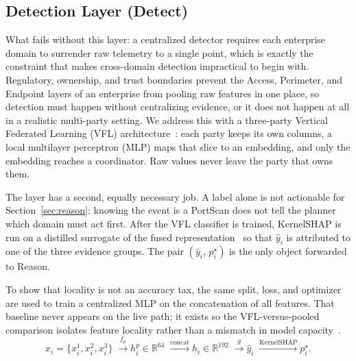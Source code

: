 
\subsection{Detection Layer (Detect)}
\label{sec:detect}

What fails without this layer: a centralized detector requires each enterprise domain to surrender raw telemetry to a single point, which is exactly the constraint that makes cross-domain detection impractical to begin with. Regulatory, ownership, and trust boundaries prevent the Access, Perimeter, and Endpoint layers of an enterprise from pooling raw features in one place, so detection must happen without centralizing evidence, or it does not happen at all in a realistic multi-party setting. We address this with a three-party Vertical Federated Learning (VFL) architecture~\cite{liu2024vfl,folino2024,alazab2022}: each party keeps its own columns, a local multilayer perceptron (MLP) maps that slice to an embedding, and only the embedding reaches a coordinator. Raw values never leave the party that owns them.

The layer has a second, equally necessary job. A label alone is not actionable for Section~\ref{sec:reason}: knowing the event is a PortScan does not tell the planner which domain must act first. After the VFL classifier is trained, KernelSHAP is run on a distilled surrogate of the fused representation~\cite{wu2023falcon} so that $\hat{y}_i$ is attributed to one of the three evidence groups. The pair $(\hat{y}_i,\, p_i^{\star})$ is the only object forwarded to Reason.

To show that locality is not an accuracy tax, the same split, loss, and optimizer are used to train a centralized MLP on the concatenation of all features. That baseline never appears on the live path; it exists so the VFL-versus-pooled comparison isolates feature locality rather than a mismatch in model capacity~\cite{ye2024vfl}.
\begin{equation}
x_i=\{x_i^1,x_i^2,x_i^3\}
\;\xrightarrow{f_p}
h_i^p\in\mathbb{R}^{64}
\;\xrightarrow{\mathrm{concat}}
h_i\in\mathbb{R}^{192}
\;\xrightarrow{g}
\hat{y}_i
\;\xrightarrow{\mathrm{KernelSHAP}}
p_i^{\star}.
\label{eq:detect-pipeline}
\end{equation}


